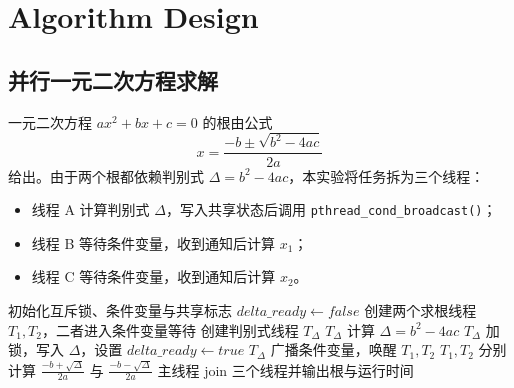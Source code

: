 \documentclass[UTF8,a4paper,12pt,fontset=none]{ctexart}
\begin{document}
\section{Algorithm Design}

\subsection{并行一元二次方程求解}

一元二次方程 \(ax^2+bx+c=0\) 的根由公式
\[
  x=\frac{-b\pm\sqrt{b^2-4ac}}{2a}
\]
给出。由于两个根都依赖判别式 \(\Delta=b^2-4ac\)，本实验将任务拆为三个线程：
\begin{itemize}
  \item 线程 A 计算判别式 \(\Delta\)，写入共享状态后调用 \texttt{pthread\_cond\_broadcast()}；
  \item 线程 B 等待条件变量，收到通知后计算 \(x_1\)；
  \item 线程 C 等待条件变量，收到通知后计算 \(x_2\)。
\end{itemize}

\begin{algorithm}[H]
  \caption{基于条件变量的一元二次方程并行求解}
  \begin{algorithmic}[1]
    \State 初始化互斥锁、条件变量与共享标志 \(\textit{delta\_ready}\gets false\)
    \State 创建两个求根线程 \(T_1,T_2\)，二者进入条件变量等待
    \State 创建判别式线程 \(T_\Delta\)
    \State \(T_\Delta\) 计算 \(\Delta=b^2-4ac\)
    \State \(T_\Delta\) 加锁，写入 \(\Delta\)，设置 \(\textit{delta\_ready}\gets true\)
    \State \(T_\Delta\) 广播条件变量，唤醒 \(T_1,T_2\)
    \State \(T_1,T_2\) 分别计算 \(\frac{-b+\sqrt{\Delta}}{2a}\) 与 \(\frac{-b-\sqrt{\Delta}}{2a}\)
    \State 主线程 join 三个线程并输出根与运行时间
  \end{algorithmic}
\end{algorithm}
\end{document}
